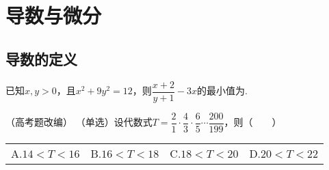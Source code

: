 \chapter{导数与微分}
\section{导数的定义}
\begin{example}{}{}
    已知$x,y>0$，且$x^2+9y^2=12$，则$\dfrac{x+2}{y+1}-3x$的最小值为\underline{\hspace{2cm}}.
\end{example}
\begin{solution}

\end{solution}
\newpage
\begin{example}{（高考题改编）}{}
    （单选）设代数式$\displaystyle T = \dfrac21\cdot\dfrac{4}{3}\cdot\dfrac{6}{5}\cdots\dfrac{200}{199}$，则（~~~~）

    \begin{tabular}{@{}llll@{}}
        A.$14< T < 16$&B.$16 < T < 18$&C.$18< T < 20$&D.$20< T < 22$
    \end{tabular}
\end{example}
